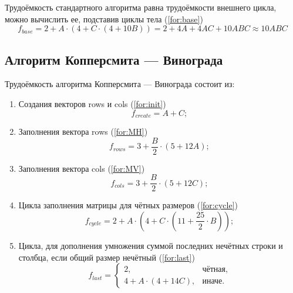 Трудоёмкость стандартного алгоритма равна трудоёмкости внешнего цикла, можно вычислить ее, подставив циклы тела (\ref{for:base})
\begin{equation}
    \label{for:base}
    f_{base} = 2 + A \cdot (4 + C \cdot (4 + 10B)) = 2 + 4A + 4AC + 10ABC \approx 10ABC
\end{equation}

\subsection{Алгоритм Копперсмита — Винограда}

Трудоёмкость алгоритма Копперсмита — Винограда состоит из:

\begin{enumerate}
    \item Создания векторов rows и cols (\ref{for:init})
    \begin{equation}
        \label{for:init}
        f_{create} = A + C;
    \end{equation}

    \item Заполнения вектора rows (\ref{for:MH})
    \begin{equation}
        \label{for:MH}
        f_{rows} = 3 + \frac{B}{2} \cdot (5 + 12A);
    \end{equation}

    \item Заполнения вектора cols (\ref{for:MV})
    \begin{equation}
        \label{for:MV}
        f_{cols} = 3 + \frac{B}{2} \cdot (5 + 12C);
    \end{equation}

    \item Цикла заполнения матрицы для чётных размеров (\ref{for:cycle})
    \begin{equation}
        \label{for:cycle}
        f_{cycle} = 2 + A \cdot (4 + C \cdot (11 + \frac{25}{2} \cdot B));
    \end{equation}

    \item Цикла, для дополнения умножения суммой последних нечётных строки и столбца, если общий размер нечётный (\ref{for:last})
    \begin{equation}
        \label{for:last}
        f_{last} = \begin{cases}
                       2, & \text{чётная,}\\
                       4 + A \cdot (4 + 14C), & \text{иначе.}
        \end{cases}
    \end{equation}
\end{enumerate}

